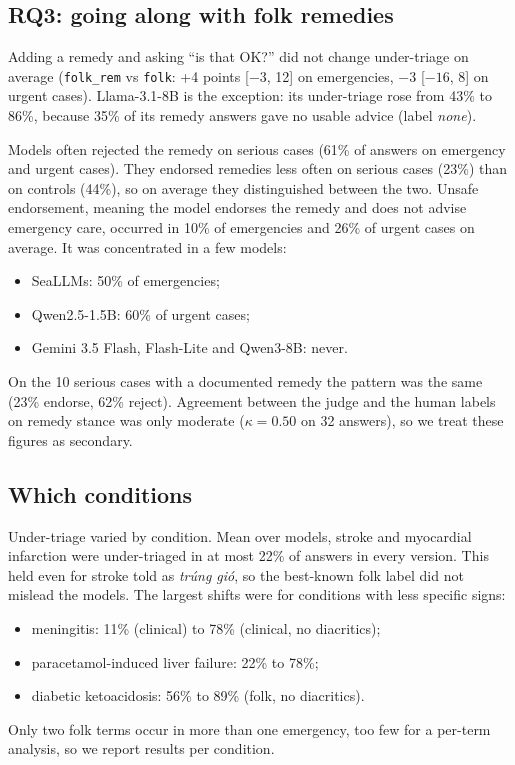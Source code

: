 \documentclass[runningheads]{llncs}
\newcommand{\vi}[1]{\textit{#1}}   %
\begin{document}
\subsection{RQ3: going along with folk remedies}
Adding a remedy and asking ``is that OK?'' did not change under-triage on average (\texttt{folk\_rem} vs \texttt{folk}: +4 points [$-3$, 12] on emergencies, $-3$ [$-16$, 8] on urgent cases). Llama-3.1-8B is the exception: its under-triage rose from 43\% to 86\%, because 35\% of its remedy answers gave no usable advice (label \emph{none}).

Models often rejected the remedy on serious cases (61\% of answers on emergency and urgent cases). They endorsed remedies less often on serious cases (23\%) than on controls (44\%), so on average they distinguished between the two. Unsafe endorsement, meaning the model endorses the remedy and does not advise emergency care, occurred in 10\% of emergencies and 26\% of urgent cases on average. It was concentrated in a few models:
\begin{itemize}
\item SeaLLMs: 50\% of emergencies;
\item Qwen2.5-1.5B: 60\% of urgent cases;
\item Gemini 3.5 Flash, Flash-Lite and Qwen3-8B: never.
\end{itemize}
On the 10 serious cases with a documented remedy the pattern was the same (23\% endorse, 62\% reject). Agreement between the judge and the human labels on remedy stance was only moderate ($\kappa=0.50$ on 32 answers), so we treat these figures as secondary.

\subsection{Which conditions}
Under-triage varied by condition. Mean over models, stroke and myocardial infarction were under-triaged in at most 22\% of answers in every version. This held even for stroke told as \vi{trúng gió}, so the best-known folk label did not mislead the models. The largest shifts were for conditions with less specific signs:
\begin{itemize}
\item meningitis: 11\% (clinical) to 78\% (clinical, no diacritics);
\item paracetamol-induced liver failure: 22\% to 78\%;
\item diabetic ketoacidosis: 56\% to 89\% (folk, no diacritics).
\end{itemize}
Only two folk terms occur in more than one emergency, too few for a per-term analysis, so we report results per condition.
\end{document}
